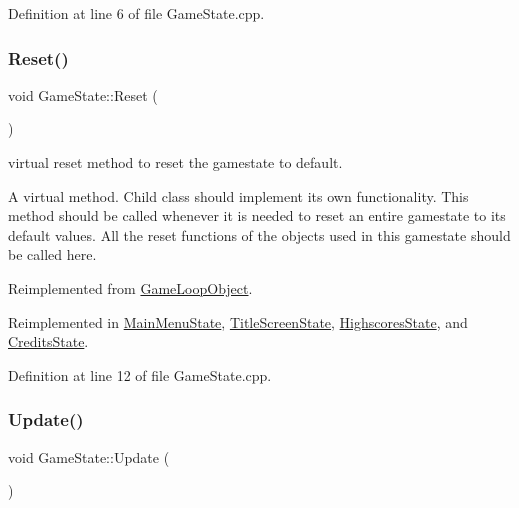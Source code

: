Definition at line 6 of file Game\+State.\+cpp.

\mbox{\label{class_game_state_a46ac6317883dff0eba4f8f305af6b6bb}} 
\subsubsection{\texorpdfstring{Reset()}{Reset()}}
{\footnotesize\ttfamily void Game\+State\+::\+Reset (\begin{DoxyParamCaption}{ }\end{DoxyParamCaption})\hspace{0.3cm}{\ttfamily [virtual]}}



virtual reset method to reset the gamestate to default. 

A virtual method. Child class should implement its own functionality. This method should be called whenever it is needed to reset an entire gamestate to its default values. All the reset functions of the objects used in this gamestate should be called here. 

Reimplemented from \hyperlink{class_game_loop_object_af61e973be170cb9437a5b7d9ecd6ef53}{Game\+Loop\+Object}.



Reimplemented in \hyperlink{class_main_menu_state_a6f6c9814913db12bc9578411620f9b56}{Main\+Menu\+State}, \hyperlink{class_title_screen_state_a7e6cf3ef5534f42a4ca1e75045a45c71}{Title\+Screen\+State}, \hyperlink{class_highscores_state_a6368de23eaf55fa1cd40cba04cbd07a0}{Highscores\+State}, and \hyperlink{class_credits_state_ad87636e8b9438092bd0151185f385c17}{Credits\+State}.



Definition at line 12 of file Game\+State.\+cpp.

\mbox{\label{class_game_state_a5be51b634f95bc6e57066ad6931aa18b}} 
\subsubsection{\texorpdfstring{Update()}{Update()}}
{\footnotesize\ttfamily void Game\+State\+::\+Update (\begin{DoxyParamCaption}{ }\end{DoxyParamCaption})\hspace{0.3cm}{\ttfamily [virtual]}}



